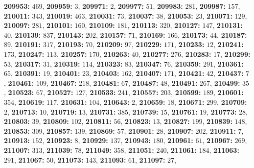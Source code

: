 \textsf{\bfseries 209953:} $469$, \textsf{\bfseries 209959:} $3$, \textsf{\bfseries 209971:} $2$, \textsf{\bfseries 209977:} $51$, \textsf{\bfseries 209983:} $281$, \textsf{\bfseries 209987:} $157$, \textsf{\bfseries 210011:} $343$, \textsf{\bfseries 210019:} $463$, \textsf{\bfseries 210031:} $73$, \textsf{\bfseries 210037:} $38$, \textsf{\bfseries 210053:} $23$, \textsf{\bfseries 210071:} $129$, \textsf{\bfseries 210097:} $281$, \textsf{\bfseries 210101:} $160$, \textsf{\bfseries 210109:} $181$, \textsf{\bfseries 210113:} $320$, \textsf{\bfseries 210127:} $147$, \textsf{\bfseries 210131:} $40$, \textsf{\bfseries 210139:} $837$, \textsf{\bfseries 210143:} $202$, \textsf{\bfseries 210157:} $71$, \textsf{\bfseries 210169:} $166$, \textsf{\bfseries 210173:} $44$, \textsf{\bfseries 210187:} $89$, \textsf{\bfseries 210191:} $317$, \textsf{\bfseries 210193:} $70$, \textsf{\bfseries 210209:} $97$, \textsf{\bfseries 210229:} $171$, \textsf{\bfseries 210233:} $12$, \textsf{\bfseries 210241:} $173$, \textsf{\bfseries 210247:} $113$, \textsf{\bfseries 210257:} $170$, \textsf{\bfseries 210263:} $40$, \textsf{\bfseries 210277:} $276$, \textsf{\bfseries 210283:} $17$, \textsf{\bfseries 210299:} $53$, \textsf{\bfseries 210317:} $31$, \textsf{\bfseries 210319:} $114$, \textsf{\bfseries 210323:} $83$, \textsf{\bfseries 210347:} $76$, \textsf{\bfseries 210359:} $291$, \textsf{\bfseries 210361:} $65$, \textsf{\bfseries 210391:} $19$, \textsf{\bfseries 210401:} $23$, \textsf{\bfseries 210403:} $162$, \textsf{\bfseries 210407:} $171$, \textsf{\bfseries 210421:} $42$, \textsf{\bfseries 210437:} $7$, \textsf{\bfseries 210461:} $109$, \textsf{\bfseries 210467:} $218$, \textsf{\bfseries 210481:} $67$, \textsf{\bfseries 210487:} $48$, \textsf{\bfseries 210491:} $267$, \textsf{\bfseries 210499:} $35$, \textsf{\bfseries 210523:} $67$, \textsf{\bfseries 210527:} $127$, \textsf{\bfseries 210533:} $241$, \textsf{\bfseries 210557:} $203$, \textsf{\bfseries 210599:} $189$, \textsf{\bfseries 210601:} $354$, \textsf{\bfseries 210619:} $117$, \textsf{\bfseries 210631:} $104$, \textsf{\bfseries 210643:} $2$, \textsf{\bfseries 210659:} $18$, \textsf{\bfseries 210671:} $299$, \textsf{\bfseries 210709:} $2$, \textsf{\bfseries 210713:} $10$, \textsf{\bfseries 210719:} $13$, \textsf{\bfseries 210731:} $385$, \textsf{\bfseries 210739:} $15$, \textsf{\bfseries 210761:} $19$, \textsf{\bfseries 210773:} $28$, \textsf{\bfseries 210803:} $39$, \textsf{\bfseries 210809:} $102$, \textsf{\bfseries 210811:} $56$, \textsf{\bfseries 210823:} $13$, \textsf{\bfseries 210827:} $199$, \textsf{\bfseries 210839:} $148$, \textsf{\bfseries 210853:} $309$, \textsf{\bfseries 210857:} $139$, \textsf{\bfseries 210869:} $57$, \textsf{\bfseries 210901:} $28$, \textsf{\bfseries 210907:} $202$, \textsf{\bfseries 210911:} $7$, \textsf{\bfseries 210913:} $152$, \textsf{\bfseries 210923:} $8$, \textsf{\bfseries 210929:} $137$, \textsf{\bfseries 210943:} $180$, \textsf{\bfseries 210961:} $61$, \textsf{\bfseries 210967:} $269$, \textsf{\bfseries 211007:} $313$, \textsf{\bfseries 211039:} $78$, \textsf{\bfseries 211049:} $358$, \textsf{\bfseries 211051:} $240$, \textsf{\bfseries 211061:} $184$, \textsf{\bfseries 211063:} $291$, \textsf{\bfseries 211067:} $50$, \textsf{\bfseries 211073:} $143$, \textsf{\bfseries 211093:} $61$, \textsf{\bfseries 211097:} $27$, 
